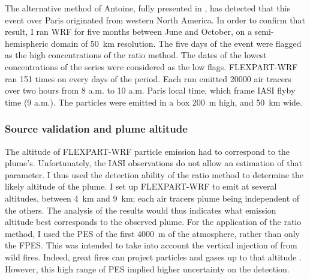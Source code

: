     The alternative method of Antoine, fully presented in \citet{ehret_long-range_2025}, has detected that this  event over Paris originated from western North America.
    In order to confirm that result, I ran WRF for five months between June and October, on a semi-hemispheric domain of \SI{50}{\km} resolution.
    The five days of the event were flagged as the high concentrations of the ratio method.
    The dates of the  lowest concentrations of the series were considered as the low flags.
    FLEXPART-WRF ran \num{151} times on every days of the period. Each run emitted \num{20000} air tracers over two hours from \num{8} a.m. to \num{10} a.m. Paris local time, which frame IASI flyby time (\num{9} a.m.).
    The particles were emitted in a box \SI{200}{\metre} high, and \SI{50}{\km} wide.

        \subsubsection{Source validation and plume altitude}
        The altitude of FLEXPART-WRF particle emission had to correspond to the  plume's. Unfortunately, the IASI observations do not allow an estimation of that parameter.
        I thus used the detection ability of the ratio method to determine the likely altitude of the plume. I set up FLEXPART-WRF to emit at several altitudes, between \SI{4}{\km} and \SI{9}{\km}; each air tracers plume being independent of the others.
        The analysis of the results would thus indicates what emission altitude best corresponds to the observed  plume.
        For the application of the ratio method, I used the PES of the first \SI{4000}{\metre} of the atmosphere, rather than only the FPES. This was intended to take into account the vertical injection of  from wild fires. Indeed, great fires can project particles and gases up to that altitude \citep{paugam_review_2015}.
        However, this high range of PES implied higher uncertainty on the detection.

